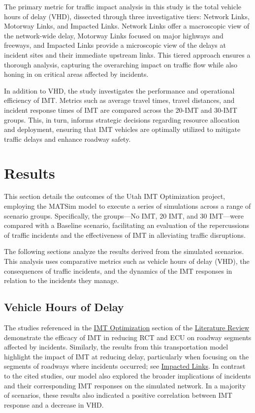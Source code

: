 \documentclass[fancy, oneside, mastersfancy, ms]{byuthesis}
\begin{document}
The primary metric for traffic impact analysis in this study is the
total vehicle hours of delay (VHD), dissected through three
investigative tiers: Network Links, Motorway Links, and Impacted Links.
Network Links offer a macroscopic view of the network-wide delay,
Motorway Links focused on major highways and freeways, and Impacted
Links provide a microscopic view of the delays at incident sites and
their immediate upstream links. This tiered approach ensures a thorough
analysis, capturing the overarching impact on traffic flow while also
honing in on critical areas affected by incidents.

In addition to VHD, the study investigates the performance and
operational efficiency of IMT. Metrics such as average travel times,
travel distances, and incident response times of IMT are compared across
the 20-IMT and 30-IMT groups. This, in turn, informs strategic decisions
regarding resource allocation and deployment, ensuring that IMT vehicles
are optimally utilized to mitigate traffic delays and enhance roadway
safety.


\hypertarget{sec-results}{%
\chapter{Results}\label{sec-results}}

This section details the outcomes of the Utah IMT Optimization project,
employing the MATSim model to execute a series of simulations across a
range of scenario groups. Specifically, the groups---No IMT, 20 IMT, and
30 IMT---were compared with a Baseline scenario, facilitating an
evaluation of the repercussions of traffic incidents and the
effectiveness of IMT in alleviating traffic disruptions.

The following sections analyze the results derived from the simulated
scenarios. This analysis uses comparative metrics such as vehicle hours
of delay (VHD), the consequences of traffic incidents, and the dynamics
of the IMT responses in relation to the incidents they manage.

\hypertarget{vehicle-hours-of-delay}{%
\section{Vehicle Hours of Delay}\label{vehicle-hours-of-delay}}

The studies referenced in the \protect\hyperlink{sec-lit_imt_opt}{IMT
Optimization} section of the
\protect\hyperlink{sec-literature}{Literature Review} demonstrate the
efficacy of IMT in reducing RCT and ECU on roadway segments affected by
incidents. Similarly, the results from this transportation model
highlight the impact of IMT at reducing delay, particularly when
focusing on the segments of roadways where incidents occurred; see
\protect\hyperlink{sec-impacted}{Impacted Links}. In contrast to the
cited studies, our model also explored the broader implications of
incidents and their corresponding IMT responses on the simulated
network. In a majority of scenarios, these results also indicated a
positive correlation between IMT response and a decrease in VHD.
\end{document}
